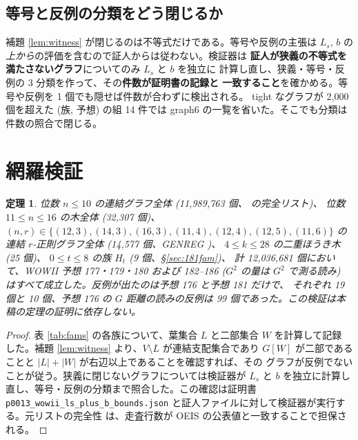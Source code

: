 \documentclass[paper=a4,fontsize=10.5pt,jafontsize=10.5pt]{jlreq}
\theoremstyle{plain}
\newtheorem{theorem}{定理}[section]
\theoremstyle{definition}
\begin{document}
\subsection{等号と反例の分類をどう閉じるか}

補題 \ref{lem:witness} が閉じるのは不等式だけである。等号や反例の主張は
$L_s$, $b$ の\emph{上から}の評価を含むので証人からは従わない。検証器は
\textbf{証人が狭義の不等式を満たさないグラフ}についてのみ $L_s$ と $b$ を独立に
計算し直し、狭義・等号・反例の 3 分類を作って、その\textbf{件数が証明書の記録と
一致すること}を確かめる。等号や反例を 1 個でも隠せば件数が合わずに検出される。
tight なグラフが 2,000 個を超えた (族, 予想) の組 14 件では graph6 の一覧を省いた。そこでも分類は件数の照合で閉じる。

\section{網羅検証}\label{sec:check}

\begin{theorem}\label{thm:main}
位数 $n \le 10$ の連結グラフ全体 (11,989,763 個、\cite{mckay} の完全リスト)、
位数 $11 \le n \le 16$ の木全体 (32,307 個)、
$(n, r) \in \{(12, 3), (14, 3), (16, 3), (11, 4), (12, 4), (12, 5), (11, 6)\}$ の連結 $r$-正則グラフ全体 (14,577 個、GENREG \cite{genreg})、
$4 \le k \le 28$ の二重ほうき木 (25 個)、
$0 \le t \le 8$ の族 $H_t$ (9 個、\S\ref{sec:181fam})、
計 12,036,681 個において、WOWII 予想 177・179・180 および 182--186 ($G^2$ の量は
$G^2$ で測る読み) はすべて成立した。反例が出たのは予想 176 と予想 181 だけで、
それぞれ 19 個と 10 個、予想 176 の $G$ 距離の読みの反例は
99 個であった。この検証は本稿の定理の証明に依存しない。
\end{theorem}

\begin{proof}
表 \ref{tab:fams} の各族について、葉集合 $L$ と二部集合 $W$ を計算して記録
した。補題 \ref{lem:witness} より、$V \setminus L$ が連結支配集合であり
$G[W]$ が二部であることと $|L| + |W|$ が右辺以上であることを確認すれば、その
グラフが反例でないことが従う。狭義に閉じないグラフについては検証器が $L_s$ と
$b$ を独立に計算し直し、等号・反例の分類まで照合した。この確認は証明書
\texttt{p0013\_wowii\_ls\_plus\_b\_bounds.json} と証人ファイルに対して検証器が実行する。元リストの完全性
は、走査行数が OEIS の公表値と一致することで担保される。
\end{proof}
\end{document}
